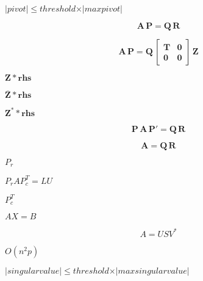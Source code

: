 \documentclass{article}
\begin{document}
$ \vert pivot \vert \leqslant threshold \times \vert maxpivot \vert $
\pagebreak

\[ \mathbf{A} \, \mathbf{P} = \mathbf{Q} \, \mathbf{R}
\]
\pagebreak

\[ \mathbf{A} \, \mathbf{P} = \mathbf{Q} \,
                    \begin{bmatrix} \mathbf{T} &  \mathbf{0} \\
                                    \mathbf{0} & \mathbf{0} \end{bmatrix} \, \mathbf{Z}
\]
\pagebreak

$ \mathbf{Z} * \mathbf{rhs} $
\pagebreak

$ \mathbf{\overline Z} * \mathbf{rhs} $
\pagebreak

$ \mathbf{Z}^* * \mathbf{rhs} $
\pagebreak

\[ \mathbf{P} \, \mathbf{A} \, \mathbf{P}' = \mathbf{Q} \, \mathbf{R}
\]
\pagebreak

\[ \mathbf{A} = \mathbf{Q} \, \mathbf{R}
\]
\pagebreak

$ P_r $
\pagebreak

$P_r A P_c^T = L U$
\pagebreak

$ P_c^T $
\pagebreak

$ A X = B $
\pagebreak

\[ A = U S V^* \]
\pagebreak

$ O(n^2p) $
\pagebreak

$ \vert singular value \vert \leqslant threshold \times \vert max singular value \vert $
\pagebreak
\end{document}
